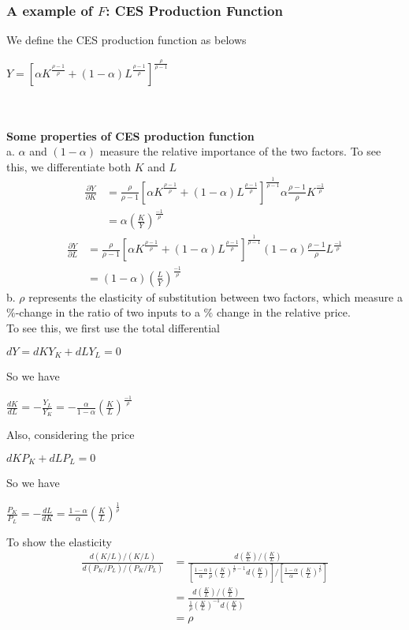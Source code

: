 \documentclass{article}
\begin{document}
\subsubsection{A example of $F$: CES Production Function}
We define the CES production function as belows\\
\centerline{$Y = [\alpha K^{\frac{\rho-1}{\rho}} + (1 - \alpha) L^{\frac{\rho-1}{\rho}}]^{\frac{\rho}{\rho-1}}$}\\\\
\textbf{Some properties of CES production function}\\
a. $\alpha$ and $(1 - \alpha)$ measure the relative importance of the two factors. To see this, we differentiate both $K$ and $L$
\begin{align*}
	\frac{\partial Y}{\partial K} &= \frac{\rho}{\rho - 1}[\alpha K^{\frac{\rho-1}{\rho}} + (1 - \alpha) L^{\frac{\rho-1}{\rho}}]^{\frac{1}{\rho-1}}\alpha \frac{\rho - 1}{\rho} K^{\frac{-1}{\rho}}\\
	&= \alpha (\frac{K}{Y})^{\frac{-1}{\rho}}
\end{align*}
\begin{align*}
	\frac{\partial Y}{\partial L} &= \frac{\rho}{\rho - 1}[\alpha K^{\frac{\rho-1}{\rho}} + (1 - \alpha) L^{\frac{\rho-1}{\rho}}]^{\frac{1}{\rho-1}}(1 - \alpha)\frac{\rho - 1}{\rho} L^{\frac{-1}{\rho}}\\
	&= (1 - \alpha)(\frac{L}{Y})^{\frac{-1}{\rho}}
\end{align*}
b. $\rho$ represents the elasticity of substitution between two factors, which measure a $\%$-change in the ratio of two inputs to a $\%$ change in the relative price.\\
To see this, we first use the total differential\\
\centerline{$dY = dKY_K + dLY_L = 0$}
So we have\\
\centerline{$\frac{dK}{dL} = -\frac{Y_L}{Y_K} = -\frac{\alpha}{1 - \alpha}(\frac{K}{L})^{\frac{-1}{\rho}}$}
Also, considering the price\\
\centerline{$dKP_K + dLP_L = 0$}
So we have\\
\centerline{$\frac{P_K}{P_L} = -\frac{dL}{dK} = \frac{1- \alpha}{\alpha} (\frac{K}{L})^{\frac{1}{\rho}}$}
To show the elasticity
\begin{align*}
	\frac{d(K/L)/(K/L)}{d(P_K/P_L)/(P_K/P_L)}
	&= \frac{d(\frac{K}{L})/(\frac{K}{L})}{[\frac{1 - \alpha}{\alpha}\frac{1}{\rho}(\frac{K}{L})^{\frac{1}{\rho}-1}d(\frac{K}{L})]/[\frac{1- \alpha}{\alpha} (\frac{K}{L})^{\frac{1}{\rho}}]}\\
	&= \frac{d(\frac{K}{L})/(\frac{K}{L})}{\frac{1}{\rho}(\frac{K}{L})^{-1}d(\frac{K}{L})}\\
	&= \rho
\end{align*}
\end{document}
